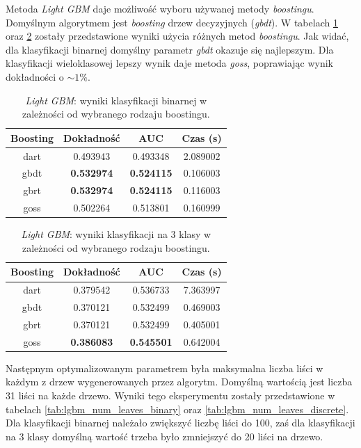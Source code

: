 \documentclass[a4paper, twoside, 11pt, openright]{article}
\begin{document}
Metoda \textit{Light GBM} daje możliwość wyboru używanej metody \textit{boostingu}. Domyślnym algorytmem jest \textit{boosting} drzew decyzyjnych (\textit{gbdt}). W tabelach \ref{tab:lgbm_boosting_binary} oraz \ref{tab:lgbm_boosting_discrete} zostały przedstawione wyniki użycia różnych metod \textit{boostingu}. Jak widać, dla klasyfikacji binarnej domyślny parametr \textit{gbdt} okazuje się najlepszym. Dla klasyfikacji wieloklasowej lepszy wynik daje metoda \textit{goss}, poprawiając wynik dokładności o $\sim 1\%$.

\begin{table}[H]
    \centering
    \begin{tabular}{|c|c|c|c|}
    \hline
        \textbf{Boosting} & \textbf{Dokładność} & \textbf{AUC} & \textbf{Czas (s)} \\ \hline
dart     &  0.493943 &  0.493348 &    2.089002 \\ \hline
gbdt     &  \textbf{0.532974} &  \textbf{0.524115} &    0.106003 \\ \hline
gbrt     &  \textbf{0.532974} &  \textbf{0.524115} &    0.116003 \\ \hline
goss     &  0.502264 &  0.513801 &    0.160999 \\ \hline
    \end{tabular}
    \caption{\textit{Light GBM}: wyniki klasyfikacji binarnej w zależności od wybranego rodzaju boostingu.}
    \label{tab:lgbm_boosting_binary}
\end{table}

\begin{table}[H]
    \centering
    \begin{tabular}{|c|c|c|c|}
    \hline
        \textbf{Boosting} & \textbf{Dokładność} & \textbf{AUC} & \textbf{Czas (s)} \\ \hline
dart     &  0.379542 &  0.536733 &    7.363997 \\ \hline
gbdt     &  0.370121 &  0.532499 &    0.469003 \\ \hline
gbrt     &  0.370121 &  0.532499 &    0.405001 \\ \hline
goss     &  \textbf{0.386083} &  \textbf{0.545501} &    0.642004 \\ \hline
    \end{tabular}
    \caption{\textit{Light GBM}: wyniki klasyfikacji na 3 klasy w zależności od wybranego rodzaju boostingu.}
    \label{tab:lgbm_boosting_discrete}
\end{table}

Następnym optymalizowanym parametrem była maksymalna liczba liści w każdym z drzew wygenerowanych przez algorytm. Domyślną wartością jest liczba 31 liści na każde drzewo. Wyniki tego eksperymentu zostały przedstawione w tabelach \ref{tab:lgbm_num_leaves_binary} oraz \ref{tab:lgbm_num_leaves_discrete}. Dla klasyfikacji binarnej należało zwiększyć liczbę liści do 100, zaś dla klasyfikacji na 3 klasy domyślną wartość trzeba było zmniejszyć do 20 liści na drzewo. 
\end{document}
